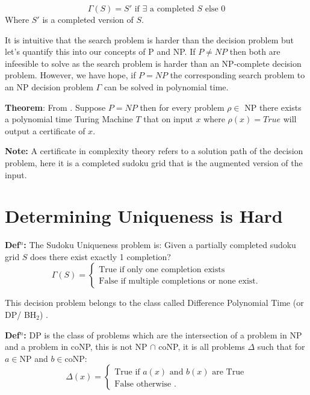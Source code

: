 \documentclass[a4paper,11pt]{report}
\begin{document}
\begin{equation}
\Gamma(S) =  S' \text{ if $\exists$ a completed $S$ else 0}
\end{equation}
Where $S'$ is a completed version of $S$.

It is intuitive that the search problem is harder than the decision problem but let's quantify this into our concepts of P and NP. If $P \neq NP$ then both are infeesible to solve as the search problem is harder than an NP-complete decision problem. However, we have hope, if $P=NP$ the corresponding search problem to an NP decision problem $\Gamma$ can be solved in polynomial time. 

\textbf{Theorem}: From \cite{compcomplexityamodernapproach}. Suppose $P=NP$ then for every problem $\rho\in$ NP there exists a polynomial time Turing Machine $T$ that on input $x$ where $\rho(x)=True$ will output a certificate of $x$.

\textbf{Note:} A certificate in complexity theory refers to a solution path of the decision problem, here it is a completed sudoku grid that is the augmented version of the input. 

\section{Determining Uniqueness is Hard}

\textbf{Def$^n$:} The Sudoku Uniqueness problem is: Given a partially completed sudoku grid $S$ does there exist exactly 1 completion?
		\begin{equation}
		        \Gamma (S) = \begin{cases}
		            \text{True if only one completion exists} \\
		            \text{False if multiple completions or none exist}.
				\end{cases}
		\end{equation}

This decision problem belongs to the class called Difference Polynomial Time (or DP/ BH$_2$) \cite{dpcomplexity}.

\textbf{Def$^n$:} DP is the class of problems which are the intersection of a problem in NP and a problem in coNP, this is not NP $\cap$ coNP, it is all problems $\Delta$ such that for $a \in $NP and $b\in $coNP:
		\begin{equation}
		        \Delta (x) = \begin{cases}
		            \text{True if $a(x)$ and $b(x)$ are True} \\
		            \text{False otherwise }.
				\end{cases}
		\end{equation}
\end{document}
